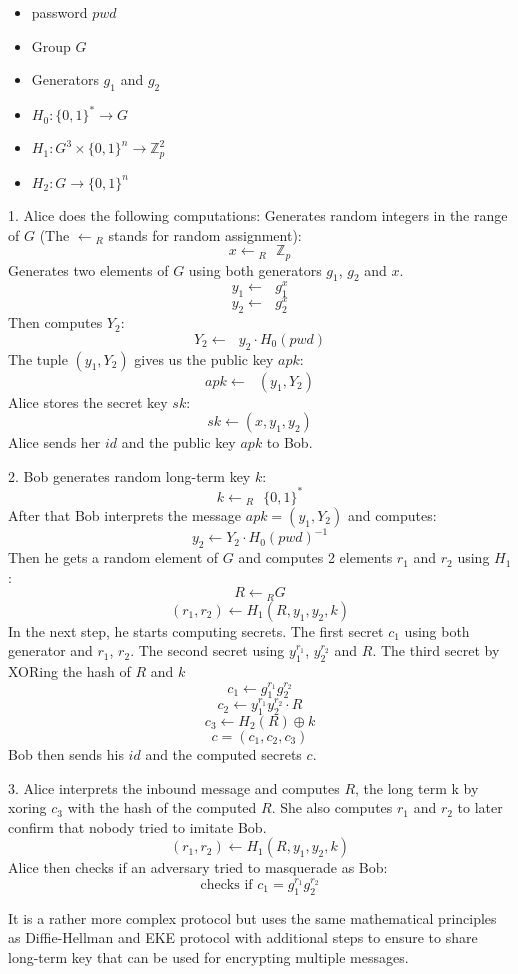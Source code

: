 \documentclass[../main.tex]{subfiles}
\begin{document}
\begin{itemize}
	\item password \(pwd\)
	\item Group \(G\)
	\item Generators \(g_1\) and \(g_2\)
	\item \(H_0: \{0,1\}^* \to G\)
	\item \(H_1: G^3 \times \{0,1\}^n \to \mathbb{Z}_p^2\)
	\item \(H_2: G \to \{0,1\}^n\)
\end{itemize}

1. Alice does the following computations:
Generates random integers in the range of \(G\) (The \(\gets{_R}\) stands for
random assignment):
\[x \gets{_R} \text{ } \mathbb{Z}_p\] 
Generates two elements of \(G\) using both generators \(g_1\), \(g_2\) and \(x\).
\[y_1 \gets \text{ } g_1^x\] 
\[y_2 \gets \text{ } g_2^x\] 
Then computes \(Y_2\):
\[Y_2 \gets \text{ } y_2 \cdot H_0(pwd)\]
The tuple \((y_1, Y_2)\) gives us the public key \(apk\):
\[apk \gets \text{ } (y_1, Y_2)\]
Alice stores the secret key \(sk\):
\[sk \gets (x, y_1, y_2)\]
Alice sends her \(id\) and the public key \(apk\) to Bob.

2. Bob generates random long-term key \(k\):
\[k \gets{_R} \text{ } \{0,1\}^*\] 
After that Bob interprets the message \(apk = (y_1, Y_2)\) and computes: 
\[y_2 \gets Y_2 \cdot H_0(pwd)^{-1}\]
Then he gets a random element of \(G\) and computes 2 elements \(r_1\) and
\(r_2\) using \(H_1\):
\[R \gets{_R} G\]
\[(r_1, r_2) \gets H_1(R, y_1, y_2, k)\]
In the next step, he starts computing secrets. The first secret \(c_1\) using both
generator and \(r_1\), \(r_2\). The second secret using \(y_1^{r_1}\),
\(y_2^{r_2}\) and \(R\). The third secret by XORing the hash of \(R\) and \(k\)
\[c_1 \gets g_1^{r_1} g_2^{r_2}\]
\[c_2 \gets y_1^{r_1} y_2^{r_2} \cdot R\]
\[c_3 \gets H_2(R) \oplus k\]
\[c = (c_1, c_2, c_3)\]
Bob then sends his \(id\) and the computed secrets \(c\).

3. Alice interprets the inbound message  and computes \(R\), the long term k by
xoring \(c_3\) with the hash of the computed \(R\). She also computes \(r_1\)
and \(r_2\) to later confirm that nobody tried to imitate Bob.
\[(r_1, r_2) \gets H_1(R, y_1, y_2, k)\]
Alice then checks if an adversary tried to masquerade as Bob:
\[\text{checks if } c_1 = g_1^{r_1} g_2^{r_2}\]

It is a rather more complex protocol but uses the same mathematical principles as
Diffie-Hellman and EKE protocol with additional steps to ensure to share
long-term key that can be used for encrypting multiple messages.
\end{document}
